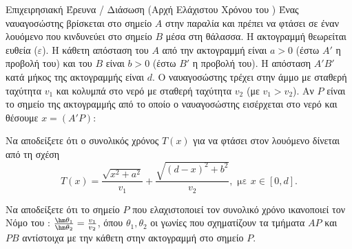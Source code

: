 \begin{problhma}{Επιχειρησιακή Έρευνα / Διάσωση (Αρχή Ελάχιστου Χρόνου του )}
Ένας ναυαγοσώστης βρίσκεται στο σημείο $A$ στην παραλία και πρέπει να φτάσει σε έναν λουόμενο που κινδυνεύει στο σημείο $B$ μέσα στη θάλασσα. Η ακτογραμμή θεωρείται ευθεία ($\varepsilon$). Η κάθετη απόσταση του $A$ από την ακτογραμμή είναι $a>0$ (έστω $A'$ η προβολή του) και του $B$ είναι $b>0$ (έστω $B'$ η προβολή του). Η απόσταση $A'B'$ κατά μήκος της ακτογραμμής είναι $d$. Ο ναυαγοσώστης τρέχει στην άμμο με σταθερή ταχύτητα $v_1$ και κολυμπά στο νερό με σταθερή ταχύτητα $v_2$ (με $v_1 > v_2$).
Αν $P$ είναι το σημείο της ακτογραμμής από το οποίο ο ναυαγοσώστης εισέρχεται στο νερό και θέσουμε $x = (A'P)$:
\begin{alist}
\item Να αποδείξετε ότι ο συνολικός χρόνος $T(x)$ για να φτάσει στον λουόμενο δίνεται από τη σχέση \[T(x) = \frac{\sqrt{x^2+a^2}}{v_1} + \frac{\sqrt{(d-x)^2+b^2}}{v_2}, \text{ με } x \in [0, d].\]
\item Να αποδείξετε ότι το σημείο $P$ που ελαχιστοποιεί τον συνολικό χρόνο ικανοποιεί τον Νόμο του : $\frac{\hm\theta_1}{\hm\theta_2} = \frac{v_1}{v_2}$, όπου $\theta_1, \theta_2$ οι γωνίες που σχηματίζουν τα τμήματα $AP$ και $PB$ αντίστοιχα με την κάθετη στην ακτογραμμή στο σημείο $P$.
\end{alist}


\end{problhma}
